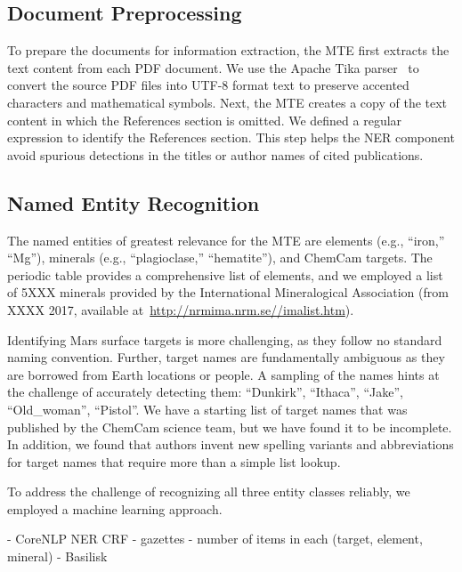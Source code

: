 \documentclass[letterpaper]{article} %
\begin{document}
\subsection{Document Preprocessing}

To prepare the documents for information extraction, the MTE first
extracts the text content from each PDF document.  We use the Apache
Tika parser~\cite{mattmann:tika11} to convert the source PDF files
into UTF-8 format text to preserve accented characters and
mathematical symbols.
Next, the MTE creates a copy of the text content in which the
References section is omitted.  We defined a regular expression to
identify the References section.
This step helps the NER component avoid spurious detections in the
titles or author names of cited publications.

\subsection{Named Entity Recognition}

The named entities of greatest relevance for the MTE are elements
(e.g., ``iron,'' ``Mg''), minerals (e.g., ``plagioclase,''
``hematite''), and ChemCam targets.  The periodic table provides a
comprehensive list of elements, and we employed a list of 5XXX minerals
provided by the International Mineralogical Association (from XXXX
2017, available at~\url{http://nrmima.nrm.se//imalist.htm}).

Identifying Mars surface targets is more challenging, as they follow
no standard naming convention.  Further, target names are
fundamentally ambiguous as they are borrowed from Earth locations or
people.  A sampling of the names hints at the challenge of accurately
detecting them: ``Dunkirk'', ``Ithaca'', ``Jake'', ``Old\_woman'',
``Pistol''.  We have a starting list of target names that was
published by the ChemCam science team, but we have found it to be
incomplete.  In addition, we found that authors invent new spelling
variants and abbreviations for target names that require more than a
simple list lookup.

To address the challenge of recognizing all three entity classes
reliably, we employed a machine learning approach.

- CoreNLP NER CRF
- gazettes - number of items in each (target, element, mineral)
- Basilisk~\cite{thelen:basilisk02}
\end{document}
